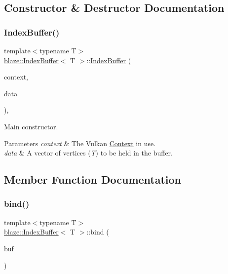 \subsection{Constructor \& Destructor Documentation}
\mbox{\label{classblaze_1_1IndexBuffer_a3b0b5603a54fb59d24fb2e46afe2d19b}} 
\subsubsection{\texorpdfstring{Index\+Buffer()}{IndexBuffer()}}
{\footnotesize\ttfamily template$<$typename T$>$ \\
\hyperlink{classblaze_1_1IndexBuffer}{blaze\+::\+Index\+Buffer}$<$ T $>$\+::\hyperlink{classblaze_1_1IndexBuffer}{Index\+Buffer} (\begin{DoxyParamCaption}\item[{const \hyperlink{classblaze_1_1Context}{Context} \&}]{context,  }\item[{const std\+::vector$<$ T $>$ \&}]{data }\end{DoxyParamCaption})\hspace{0.3cm}{\ttfamily [inline]}, {\ttfamily [noexcept]}}



Main constructor. 


\begin{DoxyParams}{Parameters}
{\em context} & The Vulkan \hyperlink{classblaze_1_1Context}{Context} in use. \\
\hline
{\em data} & A vector of vertices ({\itshape T}) to be held in the buffer. \\
\hline
\end{DoxyParams}


\subsection{Member Function Documentation}
\mbox{\label{classblaze_1_1IndexBuffer_a51ce12bd53a32ca6e6dabb37a623a922}} 
\subsubsection{\texorpdfstring{bind()}{bind()}}
{\footnotesize\ttfamily template$<$typename T$>$ \\
\hyperlink{classblaze_1_1IndexBuffer}{blaze\+::\+Index\+Buffer}$<$ T $>$\+::bind (\begin{DoxyParamCaption}\item[{Vk\+Command\+Buffer}]{buf }\end{DoxyParamCaption})\hspace{0.3cm}{\ttfamily [inline]}}




